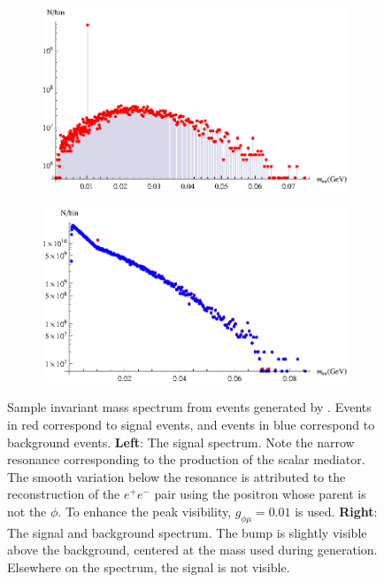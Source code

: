 \begin{figure}[t]
    \centering
    \begin{subfigure}[b]{0.45\textwidth}
        \centering
        \includegraphics[width=\textwidth]{Figures/spectra/mu_eeenunu_scalar}
        \label{fig:mu_eeenunu_scalar_spectrum}
    \end{subfigure}
    \begin{subfigure}[b]{0.45\textwidth}
        \centering
        \includegraphics[width=\textwidth]{Figures/spectra/mu_eeenunu_scalar_background}
        \label{fig:mu_eeenunu_scalar_background_spectrum}
    \end{subfigure}
    \caption{Sample invariant mass spectrum from events generated by \madgraph. Events in red correspond to signal events, and events in blue correspond to background events.
            \textbf{Left}: The signal spectrum. Note the narrow resonance corresponding to the production of the scalar mediator. The smooth variation below the resonance is attributed to the reconstruction of the $e^+e^-$ pair using the positron whose parent is not the $\phi$. To enhance the peak visibility, $g_{\phi\mu} = 0.01$ is used.
            \textbf{Right}: The signal and background spectrum. The bump is slightly visible above the background, centered at the mass used during generation. Elsewhere on the spectrum, the signal is not visible.}
    \label{fig:mu_eeenunu_spectrum}
\end{figure}

